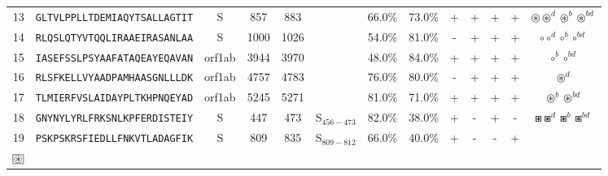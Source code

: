 \begin{tabular}{rcccccccccccc}
13 &  \texttt{GLTVLPPLLTDEMIAQYTSALLAGTIT} &       S &    857 &   883 &                &                          66.0\% &                           73.0\% &          + &           + &          + &           + &                                                                             $ \circledast \circledast^d \circledast^b \circledast^{bd} $ \\
14 &  \texttt{RLQSLQTYVTQQLIRAAEIRASANLAA} &       S &   1000 &  1026 &                &                          54.0\% &                           81.0\% &          - &           + &          + &           + &                                                                                                     $ \circ \circ^d \circ^b \circ^{bd} $ \\
15 &  \texttt{IASEFSSLPSYAAFATAQEAYEQAVAN} &  orf1ab &   3944 &  3970 &                &                          48.0\% &                           84.0\% &          + &           + &          + &           + &                                                                                                                   $ \circ^b \circ^{bd} $ \\
16 &  \texttt{RLSFKELLVYAADPAMHAASGNLLLDK} &  orf1ab &   4757 &  4783 &                &                          76.0\% &                           80.0\% &          - &           + &          + &           + &                                                                                                                        $ \circledast^d $ \\
17 &  \texttt{TLMIERFVSLAIDAYPLTKHPNQEYAD} &  orf1ab &   5245 &  5271 &                &                          81.0\% &                           71.0\% &          + &           + &          + &           + &                                                                                                       $ \circledast^b \circledast^{bd} $ \\
18 &  \texttt{GNYNYLYRLFRKSNLKPFERDISTEIY} &       S &    447 &   473 &  S$_{456-473}$ &                          82.0\% &                           38.0\% &          + &           - &          + &           - &                                                                                             $ \boxast \boxast^d \boxast^b \boxast^{bd} $ \\
19 &  \texttt{PSKPSKRSFIEDLLFNKVTLADAGFIK} &       S &    809 &   835 &  S$_{809-812}$ &                          66.0\% &                           40.0\% &          + &           - &          - &           + &                       \Centerstack{  $\boxast \boxast^b \boxcircle \boxcircle^d$ \\  $\setlength{\fboxsep}{0.5pt} \boxed{\circledast}$ } \\
\bottomrule
\end{tabular}
